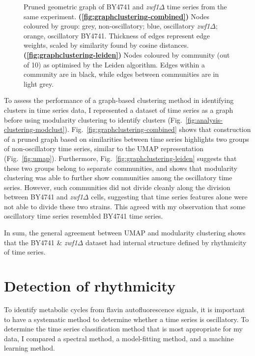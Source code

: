 \begin{figure}[htbp]
  \caption{
    Pruned geometric graph of BY4741 and \textit{zwf1$\Delta$} time series from the same experiment.
    \textbf{(\ref{fig:graphclustering-combined})}
    Nodes coloured by group: grey, non-oscillatory; blue, oscillatory \textit{zwf1$\Delta$}; orange, oscillatory BY4741.
    Thickness of edges represent edge weights, scaled by similarity found by cosine distances.
    \textbf{(\ref{fig:graphclustering-leiden})}
    Nodes coloured by community (out of 10) as optimised by the Leiden algorithm.
    Edges within a community are in black, while edges between communities are in light grey.
  }
  \label{fig:graphclustering}
\end{figure}


To assess the performance of a graph-based clustering method in identifying clusters in time series data, I represented a dataset of time series as a graph before using modularity clustering to identify clusters (Fig.\ \ref{fig:analysis-clustering-modclust}).
Fig.\ \ref{fig:graphclustering-combined} shows that construction of a pruned graph based on similarities between time series highlights two groups of non-oscillatory time series, similar to the UMAP representation (Fig.\ \ref{fig:umap}).
Furthermore, Fig.\ \ref{fig:graphclustering-leiden} suggests that these two groups belong to separate communities, and shows that modularity clustering was able to further show communities among the oscillatory time series.
However, such communities did not divide cleanly along the division between BY4741 and \textit{zwf1$\Delta$} cells, suggesting that time series features alone were not able to divide these two strains.
This agreed with my observation that some oscillatory  time series resembled BY4741 time series.


In sum, the general agreement between UMAP and modularity clustering shows that the BY4741 \& \textit{zwf1$\Delta$} dataset had internal structure defined by rhythmicity of time series.


\section{Detection of rhythmicity}
\label{sec:analysis-classification}

To identify metabolic cycles from flavin autofluorescence signals, it is important to have a systematic method to determine whether a time series is oscillatory.
To determine the time series classification method that is most appropriate for my data, I compared a spectral method, a model-fitting method, and a machine learning method.


